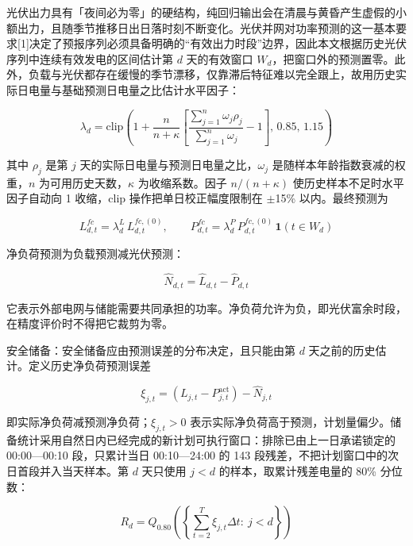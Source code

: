 \documentclass[12pt,a4paper]{ctexart}
\begin{document}
光伏出力具有「夜间必为零」的硬结构，纯回归输出会在清晨与黄昏产生虚假的小额出力，且随季节推移日出日落时刻不断变化。光伏并网对功率预测的这一基本要求[1]决定了预报序列必须具备明确的``有效出力时段''边界，因此本文根据历史光伏序列中连续有效发电的区间估计第 $d$ 天的有效窗口 $W_d$，把窗口外的预测置零。此外，负载与光伏都存在缓慢的季节漂移，仅靠滞后特征难以完全跟上，故用历史实际日电量与基础预测日电量之比估计水平因子：

\begin{equation}
\lambda_d=\mathrm{clip}\left(1+\frac{n}{n+\kappa}\left[\frac{\sum_{j=1}^{n}\omega_j\rho_j}{\sum_{j=1}^{n}\omega_j}-1\right],\,0.85,\,1.15\right)
\end{equation}

其中 $\rho_j$ 是第 $j$ 天的实际日电量与预测日电量之比，$\omega_j$ 是随样本年龄指数衰减的权重，$n$ 为可用历史天数，$\kappa$ 为收缩系数。因子 $n/(n+\kappa)$ 使历史样本不足时水平因子自动向 1 收缩，$\mathrm{clip}$ 操作把单日校正幅度限制在 $\pm$15\% 以内。最终预测为

\begin{equation}
L_{d,t}^{fc}=\lambda_d^{L}\,L_{d,t}^{fc,(0)},\qquad P_{d,t}^{fc}=\lambda_d^{P}\,P_{d,t}^{fc,(0)}\,\mathbf{1}(t\in W_d)
\end{equation}

净负荷预测为负载预测减光伏预测：

\begin{equation}
\widehat{N}_{d,t}=\widehat{L}_{d,t}-\widehat{P}_{d,t}
\end{equation}

它表示外部电网与储能需要共同承担的功率。净负荷允许为负，即光伏富余时段，在精度评价时不得把它裁剪为零。

安全储备：安全储备应由预测误差的分布决定，且只能由第 $d$ 天之前的历史估计。定义历史净负荷预测误差

\begin{equation}
\xi_{j,t}=\left(L_{j,t}-P_{j,t}^{\mathrm{act}}\right)-\widehat{N}_{j,t}
\end{equation}

即实际净负荷减预测净负荷；$\xi_{j,t}>0$ 表示实际净负荷高于预测，计划量偏少。储备统计采用自然日内已经完成的新计划可执行窗口：排除已由上一日承诺锁定的 00:00—00:10 段，只累计当日 00:10—24:00 的 143 段残差，不把计划窗口中的次日首段并入当天样本。第 $d$ 天只使用 $j<d$ 的样本，取累计残差电量的 80\% 分位数：

\begin{equation}
R_d=Q_{0.80}\left(\left\{\sum_{t=2}^{T}\xi_{j,t}\Delta t:\ j<d\right\}\right)
\end{equation}
\end{document}

